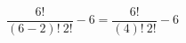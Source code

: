\documentclass[preview]{standalone}
\begin{document}
\begin{center}
\[ \frac{ \: 6! \: }{(6-2)! \: 2!} - 6 = \frac{ \: 6! \: }{(4)! \: 2!} - 6\]
\end{center}
\end{document}
